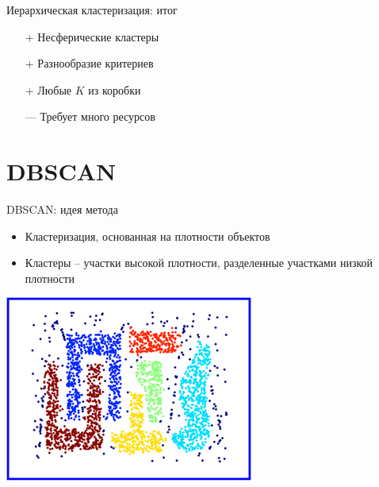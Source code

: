 \documentclass[10pt]{beamer}
\begin{document}
\begin{frame}{Иерархическая кластеризация: итог}

\begin{itemize}
\item[+] Несферические кластеры
\item[+] Разнообразие критериев
\item[+] Любые $K$ из коробки
\item[---] Требует много ресурсов
\end{itemize}

\end{frame}


\section{DBSCAN}


\begin{frame}{DBSCAN: идея метода}

\begin{itemize}
\item Кластеризация, основанная на плотности объектов
\item Кластеры -- участки высокой плотности, разделенные участками низкой плотности
\end{itemize}

\begin{center}
\includegraphics[scale=0.6]{images/dbscan.jpg}
\end{center}

\end{frame}
\end{document}
